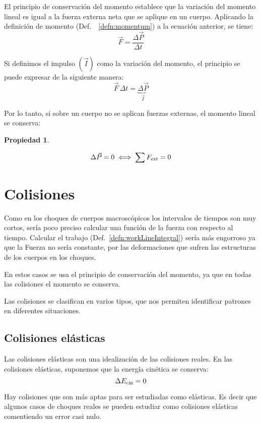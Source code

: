 \documentclass[a5paper,12pt,twoside]{book}
\newtheorem{prop}{{Propiedad}}[chapter]
\begin{document}
El principio de conservación del momento establece que la variación del momento lineal es igual a la fuerza externa neta que se aplique en un cuerpo.
Aplicando la definición de momento (Def.\ ~\ref{defn:momentum}) a la ecuación anterior, se tiene:
\[ \Vec{F} = \frac{\Delta \Vec{P}}{\Delta t} \]

Si definimos el impulso $(\Vec{I})$ como la variación del momento, el principio se puede expresar de la siguiente manera:
\[ \Vec{F} \, \Delta t = \underbrace{\Delta \Vec{P}}_{\Vec{I}} \]

Por lo tanto, si sobre un cuerpo no se aplican fuerzas externas, el momento lineal se conserva:

\begin{mdframed}[style=MyFrame1]
    \begin{prop}
    \end{prop}
    \begin{equation*}
        \Delta \Vec{P} = 0 \iff \sum {{F}_\textsl{{ext}}} = 0
    \end{equation*}
\end{mdframed}


\section{Colisiones}

Como en los choques de cuerpos macroscópicos los intervalos de tiempos son muy cortos, sería poco preciso calcular una función de la fuerza con respecto al tiempo.
Calcular el trabajo (Def.\ \ref{defn:workLineIntegral}) sería más engorroso ya que la Fuerza no sería constante, por las deformaciones que sufren las estructuras de los cuerpos en los choques.

En estos casos se usa el principio de conservación del momento, ya que en todas las colisiones el momento se conserva.

Las colisiones se clasifican en varios tipos, que nos permiten identificar patrones en diferentes situaciones.


\subsection{Colisiones elásticas}

Las colisiones elásticas son una idealización de las colisiones reales.
En las colisiones elásticas, suponemos que la energía cinética se conserva:
\[ \Delta {{E}_\textsl{{cin}}} = 0 \]

Hay colisiones que son más aptas para ser estudiadas como elásticas.
Es decir que algunos casos de choques reales se pueden estudiar como colisiones elásticas comentiendo un error casi nulo.
\end{document}
